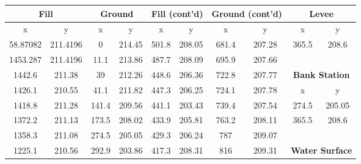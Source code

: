\begin{center}
\begin{tabular}{|cccc||cccc||cc|} 
    \hline
    \multicolumn{2}{|c}{\textbf{Fill}} & \multicolumn{2}{c||}{\textbf{Ground}} & \multicolumn{2}{c}{\textbf{Fill (cont'd)}} & \multicolumn{2}{c||}{\textbf{Ground (cont'd) }} & \multicolumn{2}{c|}{\textbf{Levee}}           \\ 
    \hline
    x        & y                       & x     & y                            & x     & y                                  & x      & y                                     & x        & y                                  \\
    58.87082 & 211.4196                & 0     & 214.45                       & 501.8 & 208.05                             & 681.4  & 207.28                                & 365.5    & 208.6                              \\
    1453.287 & 211.4196                & 11.1  & 213.86                       & 487.7 & 208.09                             & 695.9  & 207.66                                &          &                                    \\
    1442.6   & 211.38                  & 39    & 212.26                       & 448.6 & 206.36                             & 722.8  & 207.77                                & \multicolumn{2}{c|}{\textbf{Bank Station}}    \\ 
    \cline{9-10}
    1426.1   & 210.55                  & 41.1  & 211.82                       & 447.3 & 206.25                             & 724.1  & 207.78                                & x        & y                                  \\
    1418.8   & 211.28                  & 141.4 & 209.56                       & 441.1 & 203.43                             & 739.4  & 207.54                                & 274.5    & 205.05                             \\
    1372.2   & 211.13                  & 173.5 & 208.02                       & 433.9 & 205.81                             & 763.2  & 208.11                                & 365.5    & 208.6                              \\
    1358.3   & 211.08                  & 274.5 & 205.05                       & 429.3 & 206.24                             & 787    & 209.07                                &          &                                    \\
    1225.1   & 210.56                  & 292.9 & 203.86                       & 417.3 & 208.31                             & 816    & 209.31                                & \multicolumn{2}{c|}{\textbf{Water Surface}}   \\ 

\end{tabular}
\end{center}
